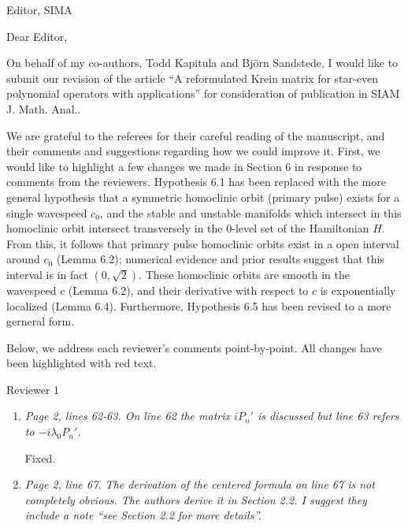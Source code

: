 \documentclass[11pt]{letter}
\begin{document}
\address{Ross Parker \\
Division of Applied Mathematics \\
Brown University \\
Providence, RI 02912 \\
\texttt{ross\_parker@brown.edu}}%
\signature{Ross Parker}
\begin{letter}{Editor, SIMA}

\opening{Dear Editor,}

On behalf of my co-authors, Todd Kapitula and Bj\"orn Sandstede, I would like to submit our revision of the article ``A reformulated Krein matrix for star-even polynomial operators with applications'' for consideration of publication in SIAM J. Math. Anal..

We are grateful to the referees for their careful reading of the manuscript, and their comments and suggestions regarding how we could improve it. First, we would like to highlight a few changes we made in Section 6 in response to comments from the reviewers. Hypothesis 6.1 has been replaced with the more general hypothesis that a symmetric homoclinic orbit (primary pulse) exists for a single wavespeed $c_0$, and the stable and unstable manifolds which intersect in this homoclinic orbit intersect transversely in the 0-level set of the Hamiltonian $H$. From this, it follows that primary pulse homoclinic orbits exist in a open interval around $c_0$ (Lemma 6.2); numerical evidence and prior results suggest that this interval is in fact $(0, \sqrt{2})$. These homoclinic orbits are smooth in the wavespeed $c$ (Lemma 6.2), and their derivative with respect to $c$ is exponentially localized (Lemma 6.4). Furthermore, Hypothesis 6.5 has been revised to a more gerneral form.

Below, we address each reviewer's comments point-by-point. All changes have been highlighted with red text.

Reviewer 1
\begin{enumerate}

\item \emph{Page 2, lines 62-63. On line 62 the matrix $iP_n'$ is discussed but line 63 refers to $-i\lambda_0 P_n'$.}
\vspace{4mm}

Fixed.

\item \emph{Page 2, line 67. The derivation of the centered formula on line 67 is not completely obvious. The authors derive it in Section 2.2. I suggest they include a note ``see Section 2.2 for more details''.}
\vspace{4mm}


\end{enumerate}
\end{letter}
\end{document}
